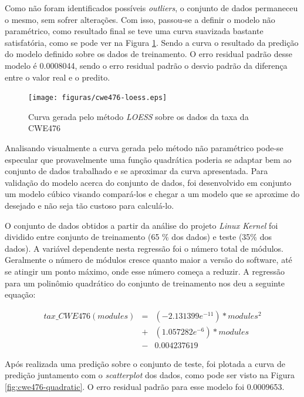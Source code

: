 Como não foram identificados possíveis \textit{outliers}, o conjunto de dados
permaneceu o mesmo, sem sofrer alterações. Com isso, passou-se a definir o
modelo não paramétrico, como resultado final se teve uma curva suavizada
bastante satisfatória, como se pode ver na Figura \ref{fig:cwe476-loess}. Sendo
a curva o resultado da predição do modelo definido sobre os dados de
treinamento. O erro residual padrão desse modelo é 0.0008044, sendo o erro
residual padrão o desvio padrão da diferença entre o valor real e o predito.

\begin{figure}[h]
  \centering
  \texttt{[image: figuras/cwe476-loess.eps]}
      \caption{Curva gerada pelo método \textit{LOESS} sobre os dados da taxa da CWE476}
  \label{fig:cwe476-loess}
\end{figure}

Analisando visualmente a curva gerada pelo método não paramétrico pode-se
especular que provavelmente uma função quadrática poderia se adaptar bem ao
conjunto de dados trabalhado e se aproximar da curva apresentada. Para validação
do modelo acerca do conjunto de dados, foi desenvolvido em conjunto um modelo
cúbico visando compará-los e chegar a um modelo que se aproxime do desejado e
não seja tão custoso para calculá-lo. 

O conjunto de dados obtidos a partir da análise do projeto \textit{Linux Kernel}
foi dividido entre conjunto de treinamento (65 \% dos dados) e teste (35\% dos
dados). A variável dependente nesta regressão foi o número total de módulos.
Geralmente o número de módulos cresce quanto maior a versão do software, até se
atingir um ponto máximo, onde esse número começa a reduzir. A regressão para um
polinômio quadrático do conjunto de treinamento nos deu a seguinte equação:


 \begin{align*}
  tax\_CWE476(modules) &=& (-2.131399e^{-11}) * modules^{2} \\
                       &+& (1.057282e^{-6}) * modules \\
                       &-& 0.004237619 
 \end{align*}



Após realizada uma predição sobre o conjunto de teste, foi plotada a curva de
predição juntamento com o \textit{scatterplot} dos dados, como pode ser visto na
Figura \ref{fig:cwe476-quadratic}. O erro residual padrão para esse modelo foi
0.0009653.


